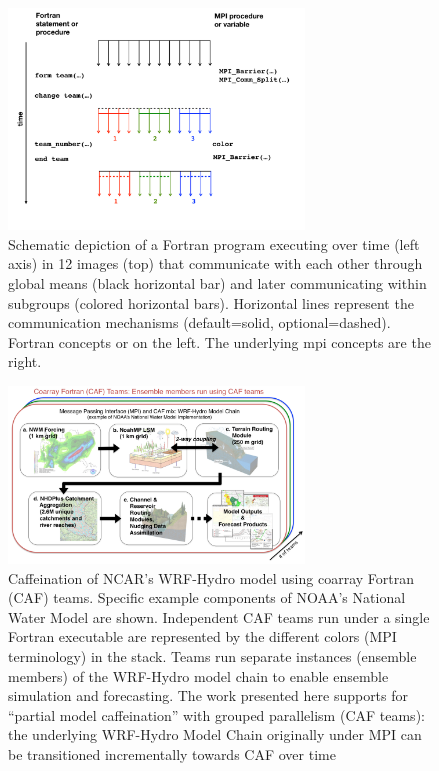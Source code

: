 \begin{figure}
\includegraphics[width=0.7\textwidth]{figures/teams}
\vspace{-36pt}
\caption{Schematic depiction of a Fortran program executing over time
  (left axis) in 12 images (top) that communicate with each other through global means (black horizontal bar) and later communicating within subgroups (colored horizontal bars).  Horizontal lines represent the communication mechanisms (default=solid, optional=dashed).  Fortran concepts or on the left.  The underlying \gls{mpi} concepts are the right.}
\end{figure}
%

\begin{figure}
\includegraphics[width=0.7\textwidth]{figures/WRF-Hydro-caf-ens-model_chain.png}
\vspace{-7pt}
\caption{Caffeination of NCAR's WRF-Hydro model using coarray Fortran (CAF)
  teams. Specific example components of  NOAA's National Water
  Model are shown. Independent CAF teams run under a single Fortran executable are represented by the different colors
  (MPI terminology) in the stack.  Teams run separate instances
  (ensemble members) of the WRF-Hydro model chain to enable ensemble
  simulation and forecasting. The work presented  here supports for ``partial model caffeination'' with grouped
  parallelism (CAF teams): the underlying WRF-Hydro Model Chain
  originally under MPI can be transitioned incrementally towards CAF
  over time}
\end{figure}
%
